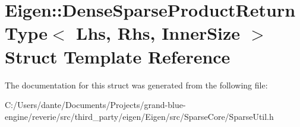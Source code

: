 \hypertarget{struct_eigen_1_1_dense_sparse_product_return_type}{}\section{Eigen\+::Dense\+Sparse\+Product\+Return\+Type$<$ Lhs, Rhs, Inner\+Size $>$ Struct Template Reference}
\label{struct_eigen_1_1_dense_sparse_product_return_type}


The documentation for this struct was generated from the following file\+:\begin{DoxyCompactItemize}
\item 
C\+:/\+Users/dante/\+Documents/\+Projects/grand-\/blue-\/engine/reverie/src/third\+\_\+party/eigen/\+Eigen/src/\+Sparse\+Core/Sparse\+Util.\+h\end{DoxyCompactItemize}
